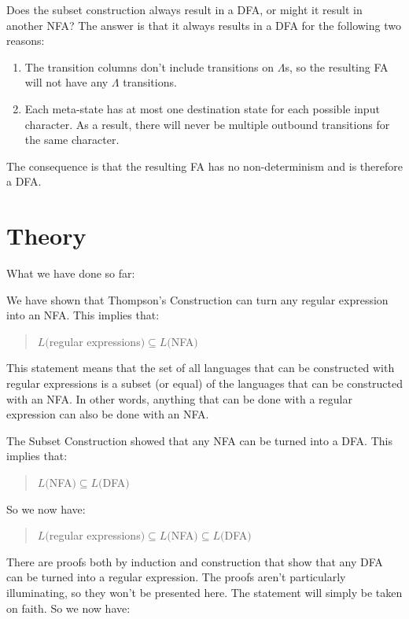 \documentclass[letterpaper,12pt,openany,reqno]{book}%
\begin{document}
Does the subset construction always result in a DFA, or might it result in another NFA? The answer is that it always results in a DFA for the following two reasons:
\begin{enumerate}
\item The transition columns don't include transitions on $\Lambda$s, so the resulting FA will not have any $\Lambda$ transitions.
\item Each meta-state has at most one destination state for each possible input character. As a result, there will never be multiple outbound transitions for the same character.
\end{enumerate}
The consequence is that the resulting FA has no non-determinism and is therefore a DFA.

\chapter{Theory}
\label{C.RL.theory}

What we have done so far:

We have shown that Thompson's Construction can turn any regular expression into an NFA. This implies that:
\begin{quote}
$L($regular expressions$) \subseteq L($NFA$)$
\end{quote}
This statement means that the set of all languages that can be constructed with regular expressions is a subset (or equal) of the languages that can be constructed with an NFA. In other words, anything that can be done with a regular expression can also be done with an NFA.

The Subset Construction showed that any NFA can be turned into a DFA. This implies that:
\begin{quote}
$L($NFA$) \subseteq L($DFA$)$
\end{quote}
So we now have:
\begin{quote}
$L($regular expressions$) \subseteq L($NFA$) \subseteq L($DFA$)$
\end{quote}

There are proofs both by induction and construction that show that any DFA can be turned into a regular expression. The proofs aren't particularly illuminating, so they won't be presented here. The statement will simply be taken on faith. So we now have:
\end{document}
